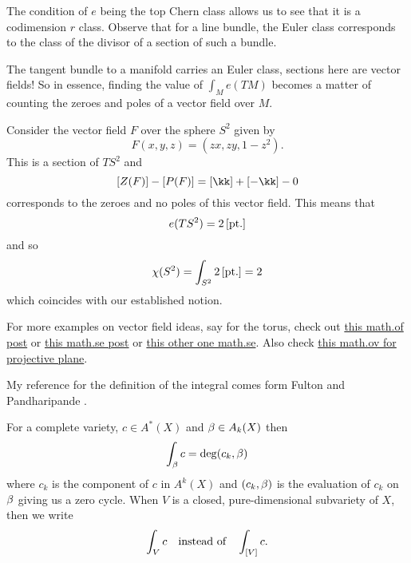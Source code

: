 \documentclass[12pt]{memoir}
\begin{document}
\begin{Rmk}
The condition of $e$ being the top Chern class allows us to see that it is a codimension $r$ class. Observe that for a line bundle, the Euler class corresponds to the class of the divisor of a section of such a bundle.
\end{Rmk}

\begin{Ex}
    The tangent bundle to a manifold carries an Euler class, sections here are vector fields! So in essence, finding the value of $\int_Me(TM)$ becomes a matter of counting the zeroes and poles of a vector field over $M$.
\end{Ex}

\begin{Ex}
    Consider the vector field $F$ over the sphere $S^2$ given by 
    $$F(x,y,z)=(zx,zy,1-z^2).$$
    This is a section of $TS^2$ and
    $$\bonj{Z(F)}-\bonj{P(F)}=\bonj{\kk}+\bonj{-\kk}-0$$
    corresponds to the zeroes and no poles of this vector field. This means that 
    $$e(TS^2)=2\left\lbrack\text{pt.}\right\rbrack$$
    and so 
    $$\chi(S^2)=\int_{S^2}2\left\lbrack\text{pt.}\right\rbrack=2$$
    which coincides with our established notion.
\end{Ex}

\begin{Rmk}
    For more examples on vector field ideas, say for the torus, check out \href{https://mathoverflow.net/questions/153961/constructing-a-vector-field-with-given-zeros-on-a-torus}{this math.of post} or \href{https://math.stackexchange.com/questions/213901/vector-fields-on-torus}{this math.se post} or \href{https://math.stackexchange.com/questions/3604214/non-vanishing-vector-fields-on-the-2-torus}{this other one math.se}. Also check \href{https://mathoverflow.net/questions/97449/computing-the-euler-characteristic-of-the-complex-projective-plane-using-differe}{this math.ov for projective plane}.
\end{Rmk}

My reference for the definition of the integral comes form Fulton and Pandharipande \cite{FPNotes}.

\begin{Def}
    For a complete variety, $c\in A^\ast(X)$ and $\beta\in A_k(X)$ then 
    $$\int_\beta c=\deg(c_k,\beta)$$
    where $c_k$ is the component of $c$ in $A^k(X)$ and $(c_k,\beta)$ is the evaluation of $c_k$ on $\beta$ giving us a zero cycle. When $V$ is a closed, pure-dimensional subvariety of $X$, then we write 
    $$\int_V c\quad\text{instead of}\quad\int_{\left\lbrack V\right\rbrack}c.$$
\end{Def}
\end{document}
